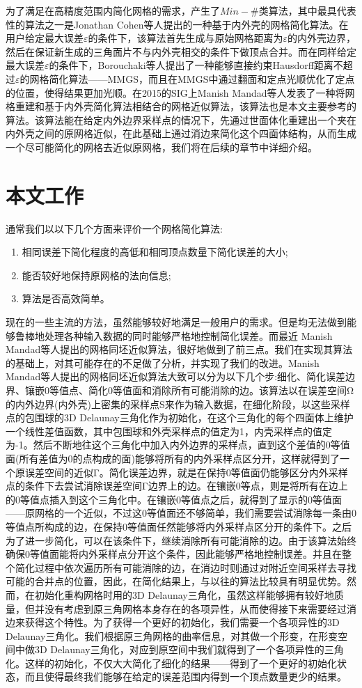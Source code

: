 为了满足在高精度范围内简化网格的需求，产生了$Min−\#$类算法，其中最具代表性的算法之一是Jonathan Cohen等人提出的一种基于内外壳的网格简化算法\cite{simp-envlop}。在用户给定最大误差$\varepsilon$的条件下，该算法首先生成与原始网格距离为$\varepsilon$的内外壳边界，然后在保证新生成的三角面片不与内外壳相交的条件下做顶点合并。而在同样给定最大误差$\varepsilon$的条件下，Borouchaki等人提出了一种能够直接约束Hausdorff距离不超过$\varepsilon$的网格简化算法——MMGS，而且在MMGS中通过翻面和定点光顺优化了定点的位置，使得结果更加光顺。在2015的SIG上Manish Mandad等人发表了一种将网格重建和基于内外壳简化算法相结合的网格近似算法，该算法也是本文主要参考的算法。该算法能在给定内外边界采样点的情况下，先通过世面体化重建出一个夹在内外壳之间的原网格近似，在此基础上通过消边来简化这个四面体结构，从而生成一个尽可能简化的网格去近似原网格，我们将在后续的章节中详细介绍。
\section{本文工作}
通常我们以以下几个方面来评价一个网格简化算法:
\begin{enumerate}[（1）]
\item 相同误差下简化程度的高低和相同顶点数量下简化误差的大小;
\item 能否较好地保持原网格的法向信息;
\item 算法是否高效简单。
\end{enumerate}
现在的一些主流的方法，虽然能够较好地满足一般用户的需求。但是均无法做到能够鲁棒地处理各种输入数据的同时能够严格地控制简化误差。而最近 Manish Mandad等人提出的网格同坯近似算法，很好地做到了前三点。我们在实现其算法的基础上，对其可能存在的不足做了分析，并实现了我们的改进。Manish Mandad等人提出的网格同坯近似算法大致可以分为以下几个步:细化、简化误差边界、镶嵌0等值点、简化0等值面和消除所有可能消除的边。该算法以在误差空间Ω的内外边界(内外壳)上密集的采样点S来作为输入数据，在细化阶段，以这些采样点的包围球的3D Delaunay三角化作为初始化，在这个三角化的每个四面体上维护一个线性差值函数，其中包围球和外壳采样点的值定为1，内壳采样点的值定为-1。然后不断地往这个三角化中加入内外边界的采样点，直到这个差值的0等值面(所有差值为0的点构成的面)能够将所有的内外采样点区分开，这样就得到了一个原误差空间的近似Γ。简化误差边界，就是在保持0等值面仍能够区分内外采样点的条件下去尝试消除误差空间Γ边界上的边。在镶嵌0等点，则是将所有在边上的0等值点插入到这个三角化中。在镶嵌0等值点之后，就得到了显示的0等值面——原网格的一个近似，不过这0等值面还不够简单，我们需要尝试消除每一条由0等值点所构成的边，在保持0等值面任然能够将内外采样点区分开的条件下。之后为了进一步简化，可以在该条件下，继续消除所有可能消除的边。由于该算法始终确保0等值面能将内外采样点分开这个条件，因此能够严格地控制误差。并且在整个简化过程中依次遍历所有可能消除的边，在消边时则通过对附近空间采样去寻找可能的合并点的位置，因此，在简化结果上，与以往的算法比较具有明显优势。然而，在初始化重构网格时用的3D Delaunay三角化，虽然这样能够拥有较好地质量，但并没有考虑到原三角网格本身存在的各项异性，从而使得接下来需要经过消边来获得这个特性。为了获得一个更好的初始化，我们需要一个各项异性的3D Delaunay三角化。我们根据原三角网格的曲率信息，对其做一个形变，在形变空间中做3D Delaunay三角化，对应到原空间中我们就得到了一个各项异性的三角化。这样的初始化，不仅大大简化了细化的结果——得到了一个更好的初始化状态，而且使得最终我们能够在给定的误差范围内得到一个顶点数量更少的结果。
